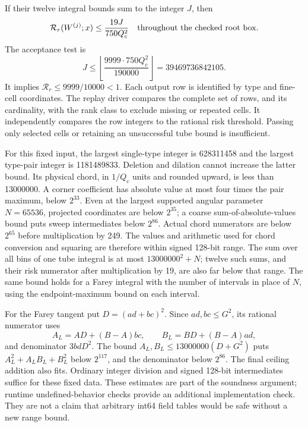 If their twelve integral bounds sum to the integer \(J\), then
\begin{equation}\label{eq:certRisk}
 \mathcal R_r(W^{(j)};x)\le\frac{19J}{750Q_c^2}
 \quad\hbox{throughout the checked root box}.
\end{equation}
The acceptance test is
\[
 J\le\left\lfloor\frac{9999\cdot750Q_c^2}{190000}\right\rfloor
      =39469736842105.
\]
It implies \(\mathcal R_r\le9999/10000<1\). Each output row is
identified by type and fine-cell coordinates. The replay driver
compares the complete set of rows, and its cardinality, with the rank
class to exclude missing or repeated cells. It independently compares
the row integers to the rational risk threshold. Passing only selected
cells or retaining an unsuccessful tube bound is insufficient.

For this fixed input, the largest single-type integer is 628311458
and the largest type-pair integer is 1181489833. Deletion and dilation
cannot increase the latter bound. Its physical chord, in \(1/Q_c\)
units and rounded upward, is less than 13000000. A corner coefficient
has absolute value at most four times the pair maximum, below
\(2^{33}\). Even at the largest supported angular parameter
\(N=65536\), projected coordinates are below \(2^{35}\); a coarse
sum-of-absolute-values bound puts sweep intermediates below \(2^{86}\).
Actual chord numerators are below \(2^{65}\) before multiplication
by 249. The values and arithmetic used for chord conversion and
squaring are therefore within signed 128-bit range.
The sum over all bins of one tube integral is at most
\(13000000^2+N\); twelve such sums, and their risk numerator after
multiplication by 19, are also far below that range.
The same bound holds for a Farey integral with the number of intervals
in place of \(N\), using the endpoint-maximum bound on each interval.

For the Farey tangent put \(D=(ad+bc)^2\). Since
\(ad,bc\le G^2\), its rational numerator uses
\[
 A_L=AD+(B-A)bc,\qquad B_L=BD+(B-A)ad,
\]
and denominator \(3bdD^2\). The bound
\(A_L,B_L\le13000000(D+G^2)\) puts
\(A_L^2+A_LB_L+B_L^2\) below \(2^{117}\), and the denominator
below \(2^{86}\). The final ceiling addition also fits. Ordinary
integer division and signed 128-bit intermediates suffice for these
fixed data. These estimates are part of the soundness argument;
runtime undefined-behavior checks provide an additional implementation
check. They are not a claim that arbitrary int64 field tables would
be safe without a new range bound.

